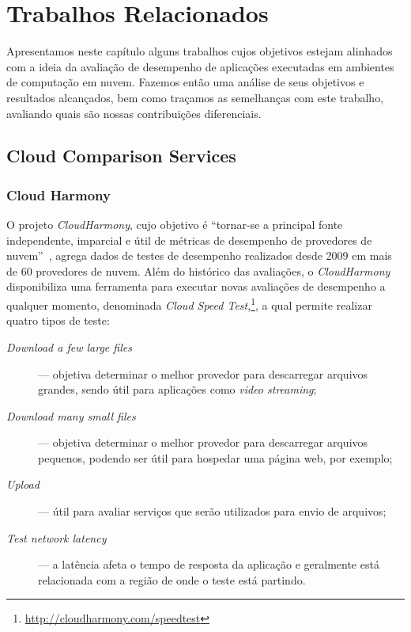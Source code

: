 \chapter[Trabalhos Relacionados]{Trabalhos Relacionados}
Apresentamos  neste capítulo alguns trabalhos cujos objetivos estejam alinhados 
com a ideia da avaliação de desempenho de aplicações executadas em ambientes de
computação em nuvem. Fazemos então uma análise de seus objetivos e resultados 
alcançados, bem como traçamos as semelhanças com este trabalho, avaliando quais são
nossas contribuições diferenciais.

\section{Cloud Comparison Services}
\subsection{Cloud Harmony}
O projeto {\em CloudHarmony}, cujo
objetivo é ``tornar-se a principal fonte independente, imparcial e útil de
métricas de desempenho de provedores de nuvem''~\cite{cloudharmony}, agrega
dados de testes de desempenho realizados desde 2009 em mais de 60 provedores de
nuvem. Além do histórico das avaliações, o {\em CloudHarmony} disponibiliza uma ferramenta para executar novas avaliações de desempenho a qualquer momento, denominada
\textit{Cloud Speed Test},\footnote{\url{http://cloudharmony.com/speedtest}}, a qual permite realizar quatro tipos de teste:

\begin{description}
  \item[\em Download a few large files] --- objetiva determinar o melhor provedor
  para descarregar arquivos grandes, sendo útil para aplicações como {\em video
  streaming};
  \item[\em Download many small files] --- objetiva determinar o melhor provedor
  para descarregar arquivos pequenos, podendo ser útil para hospedar uma página
  web, por exemplo;
  \item[\em Upload] --- útil para avaliar serviços que serão utilizados para
  envio de arquivos;
  \item[\em Test network latency] --- a latência afeta o tempo de resposta da
  aplicação e geralmente está relacionada com a região de onde o teste está
  partindo.
\end{description}

